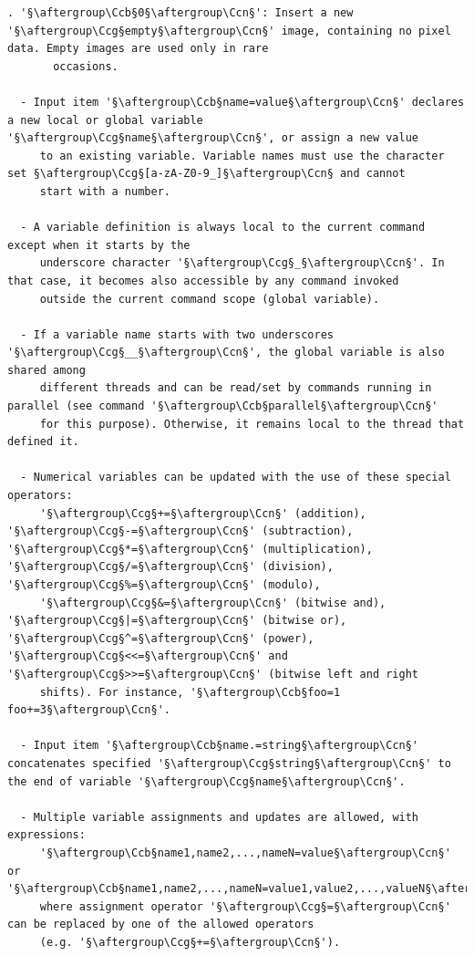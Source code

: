 \documentclass[a4paper,10.5pt,twoside]{book}
\def\Ccb{\color{cb}}
\def\Ccg{\color{cc}}
\def\Ccn{\color{black}}
\begin{document}
\begin{lstlisting}[escapechar=§]
    . '§\aftergroup\Ccb§0§\aftergroup\Ccn§': Insert a new '§\aftergroup\Ccg§empty§\aftergroup\Ccn§' image, containing no pixel data. Empty images are used only in rare 
       occasions. 
 
  - Input item '§\aftergroup\Ccb§name=value§\aftergroup\Ccn§' declares a new local or global variable '§\aftergroup\Ccg§name§\aftergroup\Ccn§', or assign a new value 
     to an existing variable. Variable names must use the character set §\aftergroup\Ccg§[a-zA-Z0-9_]§\aftergroup\Ccn§ and cannot 
     start with a number. 
 
  - A variable definition is always local to the current command except when it starts by the 
     underscore character '§\aftergroup\Ccg§_§\aftergroup\Ccn§'. In that case, it becomes also accessible by any command invoked 
     outside the current command scope (global variable). 
 
  - If a variable name starts with two underscores '§\aftergroup\Ccg§__§\aftergroup\Ccn§', the global variable is also shared among 
     different threads and can be read/set by commands running in parallel (see command '§\aftergroup\Ccb§parallel§\aftergroup\Ccn§' 
     for this purpose). Otherwise, it remains local to the thread that defined it. 
 
  - Numerical variables can be updated with the use of these special operators: 
     '§\aftergroup\Ccg§+=§\aftergroup\Ccn§' (addition), '§\aftergroup\Ccg§-=§\aftergroup\Ccn§' (subtraction), '§\aftergroup\Ccg§*=§\aftergroup\Ccn§' (multiplication), '§\aftergroup\Ccg§/=§\aftergroup\Ccn§' (division), '§\aftergroup\Ccg§%=§\aftergroup\Ccn§' (modulo), 
     '§\aftergroup\Ccg§&=§\aftergroup\Ccn§' (bitwise and), '§\aftergroup\Ccg§|=§\aftergroup\Ccn§' (bitwise or), '§\aftergroup\Ccg§^=§\aftergroup\Ccn§' (power), '§\aftergroup\Ccg§<<=§\aftergroup\Ccn§' and '§\aftergroup\Ccg§>>=§\aftergroup\Ccn§' (bitwise left and right 
     shifts). For instance, '§\aftergroup\Ccb§foo=1 foo+=3§\aftergroup\Ccn§'. 
 
  - Input item '§\aftergroup\Ccb§name.=string§\aftergroup\Ccn§' concatenates specified '§\aftergroup\Ccg§string§\aftergroup\Ccn§' to the end of variable '§\aftergroup\Ccg§name§\aftergroup\Ccn§'. 
 
  - Multiple variable assignments and updates are allowed, with expressions: 
     '§\aftergroup\Ccb§name1,name2,...,nameN=value§\aftergroup\Ccn§' or '§\aftergroup\Ccb§name1,name2,...,nameN=value1,value2,...,valueN§\aftergroup\Ccn§' 
     where assignment operator '§\aftergroup\Ccg§=§\aftergroup\Ccn§' can be replaced by one of the allowed operators 
     (e.g. '§\aftergroup\Ccg§+=§\aftergroup\Ccn§'). 
\end{lstlisting}
\end{document}
